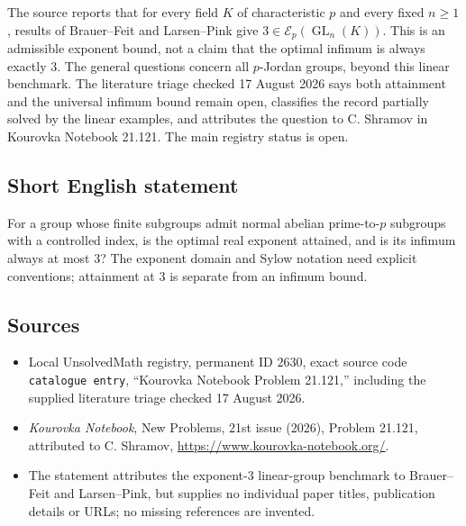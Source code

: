 \documentclass[11pt]{article}
\begin{document}
The source reports that for every field $K$ of characteristic $p$ and every fixed $n\ge1$, results of Brauer--Feit and Larsen--Pink give $3\in\mathcal E_p(\operatorname{GL}_n(K))$. This is an admissible exponent bound, not a claim that the optimal infimum is always exactly $3$. The general questions concern all $p$-Jordan groups, beyond this linear benchmark. The literature triage checked 17 August 2026 says both attainment and the universal infimum bound remain open, classifies the record partially solved by the linear examples, and attributes the question to C. Shramov in Kourovka Notebook 21.121. The main registry status is open.
\subsection{Short English statement}
For a group whose finite subgroups admit normal abelian prime-to-$p$ subgroups with a controlled index, is the optimal real exponent attained, and is its infimum always at most $3$? The exponent domain and Sylow notation need explicit conventions; attainment at $3$ is separate from an infimum bound.
\subsection{Sources}
\begin{itemize}
\item Local UnsolvedMath registry, permanent ID $2630$, exact source code \texttt{catalogue entry}, ``Kourovka Notebook Problem 21.121,'' including the supplied literature triage checked 17 August 2026.
\item \emph{Kourovka Notebook}, New Problems, 21st issue (2026), Problem 21.121, attributed to C. Shramov, \url{https://www.kourovka-notebook.org/}.
\item The statement attributes the exponent-$3$ linear-group benchmark to Brauer--Feit and Larsen--Pink, but supplies no individual paper titles, publication details or URLs; no missing references are invented.
\end{itemize}
\end{document}
